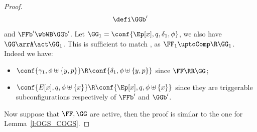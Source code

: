 \begin{proof}
\[  \defi \GGb'\]
  and $\FFb' \wbWB \GGb'$.
  Let $\GG_1 = \conf{\Ep[x],q,\delta_1,\phi}$,
  we also have 
  $\GG \arrA \act \GG_1$.
  This is sufficient to match , as 
  $\FF_1 \uptoComp \R  \GG_1$. Indeed we have:
  \begin{itemize}  
  \item $\conf{\gamma_1,\phi\uplus \{y,p\}} \R  \conf{\delta_1,\phi\uplus \{y,p\}}$
  since $\FF \RR \GG$;
  \item  $\conf{E[x],q, \phi\uplus \{x\}} \R  \conf{\Ep[x],q, \phi\uplus \{x\}}$
  since they are triggerable subconfigurations respectively of $\FFb'$ and $\GGb'$.
  \end{itemize}
\noindent
  Now suppose that $\FF,\GG$ are active,
  then the proof is similar to the one for Lemma~\ref{l:OGS_COGS}. \qedhere
  

\end{proof}
